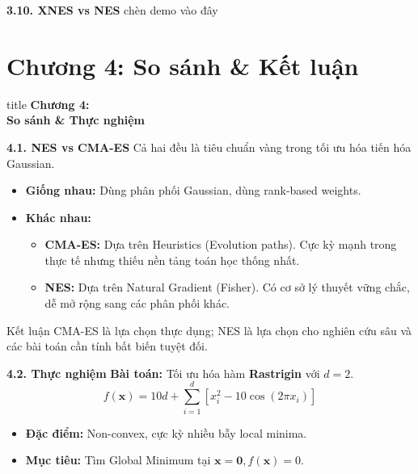 \documentclass[10pt,xcolor=dvipsnames]{beamer}
\begin{document}
\begin{frame}{\textbf{3.10. XNES vs NES}}
	chèn demo vào đây
\end{frame}
	
	\section{Chương 4: So sánh \& Kết luận}
	
	\begin{frame}
		\centering
		\begin{beamercolorbox}[sep=16pt,center,shadow=true,rounded=true]{title}
			\huge \textbf{Chương 4:\\[0.5em] So sánh \& Thực nghiệm} \par
		\end{beamercolorbox}
	\end{frame}
	
	\begin{frame}{\textbf{4.1. NES vs CMA-ES}}
		Cả hai đều là tiêu chuẩn vàng trong tối ưu hóa tiến hóa Gaussian.
		\begin{itemize}
			\item \textbf{Giống nhau:} Dùng phân phối Gaussian, dùng rank-based weights.
			\item \textbf{Khác nhau:}
			\begin{itemize}
				\item \textbf{CMA-ES:} Dựa trên Heuristics (Evolution paths). Cực kỳ mạnh trong thực tế nhưng thiếu nền tảng toán học thống nhất.
				\item \textbf{NES:} Dựa trên Natural Gradient (Fisher). Có cơ sở lý thuyết vững chắc, dễ mở rộng sang các phân phối khác.
			\end{itemize}
		\end{itemize}
		\begin{exampleblock}{Kết luận}
			CMA-ES là lựa chọn thực dụng; NES là lựa chọn cho nghiên cứu sâu và các bài toán cần tính bất biến tuyệt đối.
		\end{exampleblock}
	\end{frame}
	
	\begin{frame}{\textbf{4.2. Thực nghiệm}}
		\textbf{Bài toán:} Tối ưu hóa hàm \textbf{Rastrigin} với $d=2$.
		\[ f(\mathbf{x}) = 10d + \sum_{i=1}^{d} [x_i^2 - 10\cos(2\pi x_i)] \]
		\begin{itemize}
			\item \textbf{Đặc điểm:} Non-convex, cực kỳ nhiều bẫy local minima.
			\item \textbf{Mục tiêu:} Tìm Global Minimum tại $\mathbf{x} = \mathbf{0}, f(\mathbf{x}) = 0$.
		\end{itemize}
	\end{frame}
	
\end{document}
